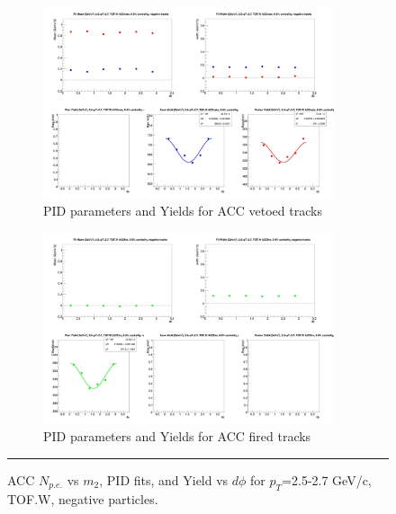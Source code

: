 \begin{figure}[H]
  \ContinuedFloat
    \begin{subfigure}{1\textwidth}
   \centering
   \includegraphics[width=0.94\textwidth]{hiptfits/neg/fitParams_tof2_cent0_ch0_pT-25-27.jpg}
    \caption{PID parameters and Yields for ACC vetoed tracks}
    \end{subfigure}    
    \begin{subfigure}{1\textwidth}
   \centering
   \includegraphics[width=0.94\textwidth]{hiptfits/neg/fitParams_tof3_cent0_ch0_pT-25-27.jpg}
    \caption{PID parameters and Yields for ACC fired tracks}
    \end{subfigure} 
    \rule{35em}{0.5pt}
  \caption[ACC $N_{p.e.}$ vs $m_2$, PID fits, and Yield vs $d\phi$ for $p_T$=2.5-2.7 GeV/c, TOF.W, negative particles.]{ACC $N_{p.e.}$ vs $m_2$, PID fits, and Yield vs $d\phi$ for $p_T$=2.5-2.7 GeV/c, TOF.W, negative particles.}
  \label{fig:acc25-27neg}
\end{figure}

